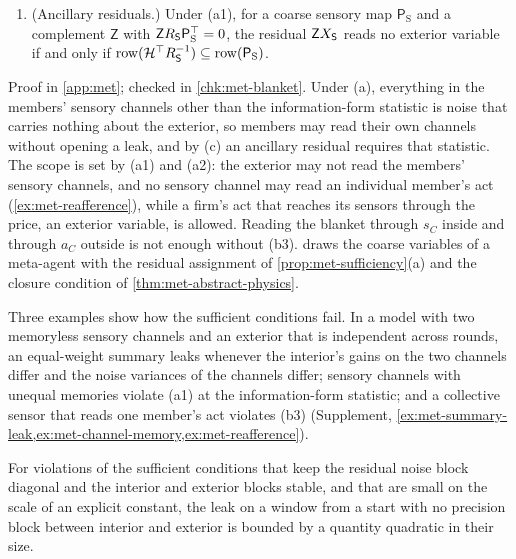\begin{proposition}
\begin{enumerate}
\item[(c)] (Ancillary residuals.) Under (a1), for a coarse sensory map $\mathsf P_{\mathrm S}$ and a complement $\mathsf Z$ with $\mathsf ZR_{\mathsf{S}}\mathsf P_{\mathrm S}^\top=0$, the residual $\mathsf ZX_{\mathsf{S}}$ reads no exterior variable if and only if $\operatorname{row}(\mathcal H^\top R_{\mathsf{S}}^{-1})\subseteq\operatorname{row}(\mathsf P_{\mathrm S})$.
\end{enumerate}
\end{proposition}
Proof in \cref{app:met}; checked in \cref{chk:met-blanket}. Under (a), everything in the members' sensory channels other than the information-form statistic is noise that carries nothing about the exterior, so members may read their own channels without opening a leak, and by (c) an ancillary residual requires that statistic. The scope is set by (a1) and (a2): the exterior may not read the members' sensory channels, and no sensory channel may read an individual member's act (\cref{ex:met-reafference}), while a firm's act that reaches its sensors through the price, an exterior variable, is allowed. Reading the blanket through $s_C$ inside and through $a_C$ outside is not enough without (b3).  draws the coarse variables of a meta-agent with the residual assignment of \cref{prop:met-sufficiency}(a) and the closure condition of \cref{thm:met-abstract-physics}.

Three examples show how the sufficient conditions fail. In a model with two memoryless sensory channels and an exterior that is independent across rounds, an equal-weight summary leaks whenever the interior's gains on the two channels differ and the noise variances of the channels differ; sensory channels with unequal memories violate (a1) at the information-form statistic; and a collective sensor that reads one member's act violates (b3) (Supplement, \cref{ex:met-summary-leak,ex:met-channel-memory,ex:met-reafference}).

For violations of the sufficient conditions that keep the residual noise block diagonal and the interior and exterior blocks stable, and that are small on the scale of an explicit constant, the leak on a window from a start with no precision block between interior and exterior is bounded by a quantity quadratic in their size.

